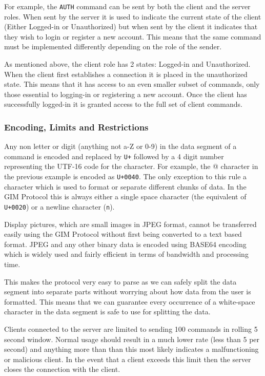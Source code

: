 For example, the \texttt{AUTH} command can be sent by both the client and the server roles. When sent by the server it is used to indicate the current state of the client (Either Logged-in or Unauthorized) but when sent by the client it indicates that they wish to login or register a new account. This means that the same command must be implemented differently depending on the role of the sender.

As mentioned above, the client role has 2 states: Logged-in and Unauthorized. When the client first establishes a connection it is placed in the unauthorized state. This means that it has access to an even smaller subset of commands, only those essential to logging-in or registering a new account. Once the client has successfully logged-in it is granted access to the full set of client commands.


\subsubsection{Encoding, Limits and Restrictions}

Any non letter or digit (anything not a-Z or 0-9) in the data segment of a command is encoded and replaced by \texttt{\SLASH U+} followed by a 4 digit number representing the UTF-16 code for the character. For example, the @ character in the previous example is encoded as \texttt{\SLASH U+0040}. The only exception to this rule a character which is used to format or separate different chunks of data. In the GIM Protocol this is always either a single space character (the equivalent of \texttt{\SLASH U+0020}) or a newline character (\texttt{\SLASH n}).

Display pictures, which are small images in JPEG format, cannot be transferred easily using the GIM Protocol without first being converted to a text based format. JPEG and any other binary data is encoded using BASE64 encoding which is widely used and fairly efficient in terms of bandwidth and processing time.

This makes the protocol very easy to parse as we can safely split the data segment into separate parts without worrying about how data from the user is formatted. This means that we can guarantee every occurrence of a white-space character in the data segment is safe to use for splitting the data.

Clients connected to the server are limited to sending 100 commands in rolling 5 second window. Normal usage should result in a much lower rate (less than 5 per second) and anything more than than this most likely indicates a malfunctioning or malicious client. In the event that a client exceeds this limit then the server closes the connection with the client.

